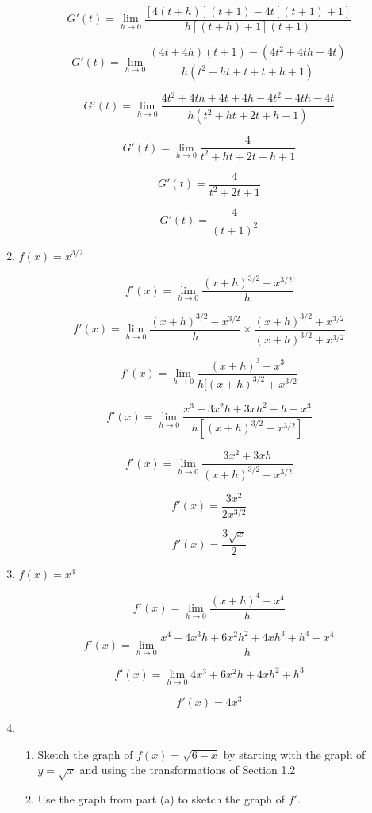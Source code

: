 \documentclass{article}
\begin{document}
\begin{enumerate}
			$$G'(t) = \lim \limits _{h \to 0} \frac{[4(t+h)](t+1) - 4t[(t+1)+1]}{h[(t+h)+1](t+1)}$$

			$$G'(t) = \lim \limits _{h \to 0} \frac{(4t+4h)(t+1) - (4t^2+4th+4t)}{h(t^2+ht+t+t+h+1)}$$

			$$G'(t) = \lim \limits _{h \to 0} \frac{4t^2+4th+4t+4h-4t^2-4th-4t}{h(t^2+ht+2t+h+1)}$$

			$$G'(t) = \lim \limits _{h \to 0} \frac{4}{t^2+ht+2t+h+1}$$

			$$G'(t) = \frac{4}{t^2+2t+1}$$

			$$G'(t) = \frac{4}{(t+1)^2}$$

		\item $f(x) = x^{3/2}$

			$$f'(x) = \lim \limits _{h \to 0} \frac{(x+h)^{3/2} - x^{3/2}}{h}$$

			$$f'(x) = \lim \limits _{h \to 0} \frac{(x+h)^{3/2} - x^{3/2}}{h} \times \frac{(x+h)^{3/2} + x^{3/2}}{(x+h)^{3/2} + x^{3/2}}$$

			$$f'(x) = \lim \limits _{h \to 0} \frac{(x+h)^3 - x^3}{h[(x+h)^{3/2} + x^{3/2}}$$

			$$f'(x) = \lim \limits _{h \to 0} \frac{x^3 - 3x^2h + 3xh^2 + h - x^3}{h[(x+h)^{3/2} + x^{3/2}]}$$	

			$$f'(x) = \lim \limits _{h \to 0} \frac{3x^2 + 3xh}{(x+h)^{3/2} + x^{3/2}}$$

			$$f'(x) = \frac{3x^2}{2x^{3/2}}$$

			$$f'(x) = \frac{3\sqrt{x}}{2}$$

		\item $f(x) = x^4$

			$$f'(x) = \lim \limits _{h \to 0} \frac{(x+h)^4 - x^4}{h}$$

			$$f'(x) = \lim \limits _{h \to 0} \frac{x^4 + 4x^3h + 6x^2h^2 + 4xh^3 + h^4 - x^4}{h}$$

			$$f'(x) = \lim \limits _{h \to 0} 4x^3 + 6x^2h + 4xh^2 + h^3$$

			$$f'(x) = 4x^3$$

		\item
		\begin{enumerate}
			\item Sketch the graph of $f(x) = \sqrt{6-x}$ by starting with the graph
				of $y = \sqrt{x}$ and using the transformations of Section 1.2

			\item Use the graph from part (a) to sketch the graph of $f'$.


\end{enumerate}
\end{enumerate}
\end{document}
